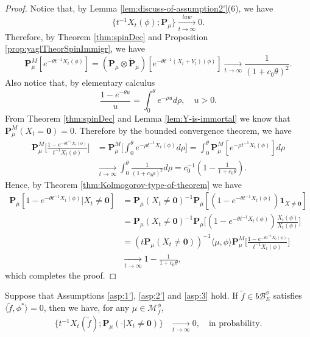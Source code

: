 \begin{proof}
	Notice that, by Lemma \ref{lem:discuss-of-assumption2'}(6), we have
\[
	\{t^{-1}X_t(\phi);\mathbf P_\mu\}
	\xrightarrow[t\to\infty]{law} 0.
\]
	Therefore, by Theorem \ref{thm:spinDec} and Proposition \ref{prop:yaglTheorSpinImmigr}, we have
\[
	\mathbf P^M_\mu[e^{-\theta t^{-1}X_t(\phi)}]
	= (\mathbf P_\mu \otimes \dot {\mathbf P}_\mu)[e^{-\theta t^{-1}(X_t+Y_t)(\phi)}]
	\xrightarrow[t\to\infty]{}\frac{1}{(1+c_0\theta)^2}.
\]
	Also notice that, by elementary calculus
\[
	\frac{1-e^{-\theta u}}{u}
	=\int_0^\theta e^{-\rho u} d\rho,
	\quad u> 0.
\]
	From Theorem \ref{thm:spinDec} and Lemma \ref{lem:Y-is-immortal} we know that $\mathbf P^M_\mu(X_t=\mathbf 0)=0$.
	Therefore by the bounded convergence theorem, we have
\[\begin{split}
	\mathbf P^M_\mu \Big[\frac{1-e^{-\theta t^{-1}X_t(\phi)}}{t^{-1}X_t(\phi)}\Big]
	&= \mathbf P^M_\mu\Big[\int_0^\theta e^{-\rho t^{-1}X_t(\phi) }d\rho\Big]
	= \int_0^\theta \mathbf P^M_\mu [ e^{-\rho t^{-1}X_t(\phi) }] d\rho\\
	&\xrightarrow[t\to\infty]{} \int_0^\theta \frac{1}{(1+c_0\rho)^2}d\rho
	= c_0^{-1} (1-\frac{1}{1+c_0\theta}).
\end{split}\]
	Hence, by Theorem \ref{thm:Kolmogorov-type-of-theorem} we have
\[\begin{split}
	\mathbf P_\mu[1-e^{-\theta t^{-1}X_t(\phi)} |X_t\neq \mathbf 0]
	&= \mathbf P_\mu(X_t\neq \mathbf 0)^{-1}\mathbf P_\mu[(1-e^{-\theta t^{-1}X_t(\phi)})\mathbf 1_{X\neq \mathbf 0}]\\
	&= \mathbf P_\mu(X_t\neq \mathbf 0)^{-1}\mathbf P_\mu\Big[(1-e^{-\theta t^{-1}X_t(\phi)})\frac{X_t(\phi)}{X_t(\phi)}\Big]\\
	&= (t\mathbf P_\mu(X_t\neq \mathbf 0))^{-1} \langle\mu,\phi\rangle \mathbf P^M_\mu \Big[\frac{1-e^{-\theta t^{-1}X_t(\phi)}}{t^{-1}X_t(\phi)}\Big]\\
	&\xrightarrow[t\to\infty]{}1-\frac{1}{1+c_0\theta},
\end{split}\]
	which completes the proof.
\end{proof}
\begin{lem}\label{lem:general-lemma}
	Suppose that Assumptions \ref{asp:1'}, \ref{asp:2'} and \ref{asp:3} hold.
	If $\tilde f\in b\mathscr B^\phi_E$ satisfies $\langle \tilde f, \phi^*\rangle = 0$, then we have, for any $\mu \in \mathcal M^\phi_f$,
\[\begin{split}
	\big\{ t^{-1} X_t(\tilde f) ; \mathbf P_\mu(\cdot|X_t \neq \mathbf 0)\big\}
	&\xrightarrow[t\to\infty]{} 0,
	\quad\text{in probability}.
\end{split}\]
\end{lem}
